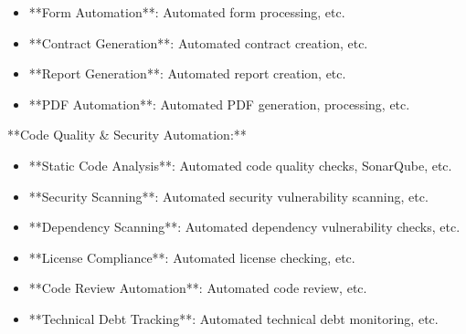 \documentclass[11pt,a4paper]{article}
\begin{document}
\begin{itemize}
\item **Form Automation**: Automated form processing, etc.
\end{itemize}

\begin{itemize}
\item **Contract Generation**: Automated contract creation, etc.
\end{itemize}

\begin{itemize}
\item **Report Generation**: Automated report creation, etc.
\end{itemize}

\begin{itemize}
\item **PDF Automation**: Automated PDF generation, processing, etc.
\end{itemize}

**Code Quality \& Security Automation:**

\begin{itemize}
\item **Static Code Analysis**: Automated code quality checks, SonarQube, etc.
\end{itemize}

\begin{itemize}
\item **Security Scanning**: Automated security vulnerability scanning, etc.
\end{itemize}

\begin{itemize}
\item **Dependency Scanning**: Automated dependency vulnerability checks, etc.
\end{itemize}

\begin{itemize}
\item **License Compliance**: Automated license checking, etc.
\end{itemize}

\begin{itemize}
\item **Code Review Automation**: Automated code review, etc.
\end{itemize}

\begin{itemize}
\item **Technical Debt Tracking**: Automated technical debt monitoring, etc.
\end{itemize}
\end{document}

